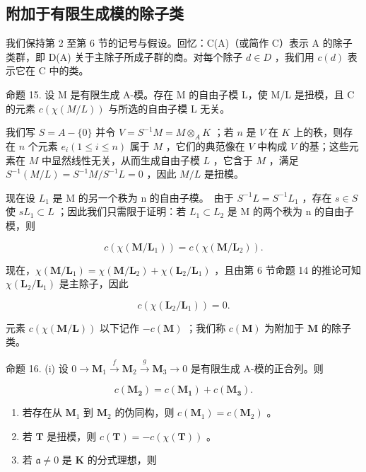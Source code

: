 \subsection{附加于有限生成模的除子类}

我们保持第 2 至第 6 节的记号与假设。回忆：C(A)（或简作 C）表示 A 的除子类群，即 D(A) 关于主除子所成子群的商。对每个除子 \(d \in D\) ，我们用 \(c(d)\) 表示它在 C 中的类。

命题 15. 设 M 是有限生成 A-模。存在 M 的自由子模 L，使 M/L 是扭模，且 C 的元素 \(c(\chi(M/L))\) 与所选的自由子模 L 无关。

我们写 \(S = A - \{0\}\) 并令 \(V = S^{-1}M = M \otimes_{A} K\) ；若 \(n\) 是 \(V\) 在 \(K\) 上的秩，则存在 \(n\) 个元素 \(e_i (1 \leqslant i \leqslant n)\) 属于 \(M\) ，它们的典范像在 \(V\) 中构成 \(V\) 的基；这些元素在 \(M\) 中显然线性无关，从而生成自由子模 \(L\) ，它含于 \(M\) ，满足 \(S^{-1}(M/L) = S^{-1}M/S^{-1}L = 0\) ，因此 \(M/L\) 是扭模。

现在设 \(L_{1}\) 是 M 的另一个秩为 n 的自由子模。~由于 \(S^{-1}L = S^{-1}L_{1}\) ，存在 \(s \in S\) 使 \(sL_{1} \subset L\) ；因此我们只需限于证明：若 \(L_{1} \subset L_{2}\) 是 M 的两个秩为 n 的自由子模，则

\[
c (\chi (\mathbf {M} / \mathbf {L} _ {1})) = c (\chi (\mathbf {M} / \mathbf {L} _ {2})).
\]

现在，\(\chi (\mathbf{M} / \mathbf{L}_1) = \chi (\mathbf{M} / \mathbf{L}_2) + \chi (\mathbf{L}_2 / \mathbf{L}_1)\) ，且由第 6 节命题 14 的推论可知 \(\chi (\mathbf{L}_2 / \mathbf{L}_1)\) 是主除子，因此

\[
c (\chi (\mathbf {L} _ {2} / \mathbf {L} _ {1})) = 0.
\]

元素 \(c(\chi(\mathbf{M} / \mathbf{L}))\) 以下记作 \(-c(\mathbf{M})\) ；我们称 \(c(\mathbf{M})\) 为附加于 \(\mathbf{M}\) 的除子类。

命题 16. (i) 设 \(0 \to \mathbf{M}_1 \xrightarrow{f} \mathbf{M}_2 \xrightarrow{g} \mathbf{M}_3 \to 0\) 是有限生成 A-模的正合列。则

\[
c (\mathbf {M _ {2}}) = c (\mathbf {M _ {1}}) + c (\mathbf {M _ {3}}).
\]

\begin{enumerate}
\def\labelenumi{(\roman{enumi})}
\setcounter{enumi}{1}
\item
  若存在从 \(\mathbf{M}_1\) 到 \(\mathbf{M}_2\) 的伪同构，则 \(c(\mathbf{M}_1) = c(\mathbf{M}_2)\) 。
\item
  若 \(\mathbf{T}\) 是扭模，则 \(c(\mathbf{T}) = -c(\chi(\mathbf{T}))\) 。
\item
  若 \(\mathfrak{a} \neq 0\) 是 \(\mathbf{K}\) 的分式理想，则
\end{enumerate}

